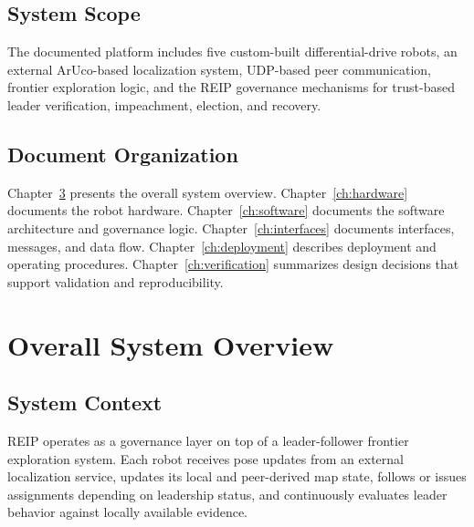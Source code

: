 \documentclass[a4paper,oneside,titlepage,11pt]{report}
\begin{document}
\section{System Scope}
The documented platform includes five custom-built differential-drive robots, an external ArUco-based localization system, UDP-based peer communication, frontier exploration logic, and the REIP governance mechanisms for trust-based leader verification, impeachment, election, and recovery.

\section{Document Organization}
Chapter~\ref{ch:overview} presents the overall system overview. Chapter~\ref{ch:hardware} documents the robot hardware. Chapter~\ref{ch:software} documents the software architecture and governance logic. Chapter~\ref{ch:interfaces} documents interfaces, messages, and data flow. Chapter~\ref{ch:deployment} describes deployment and operating procedures. Chapter~\ref{ch:verification} summarizes design decisions that support validation and reproducibility.

\chapter{Overall System Overview}
\label{ch:overview}

\section{System Context}
REIP operates as a governance layer on top of a leader-follower frontier exploration system. Each robot receives pose updates from an external localization service, updates its local and peer-derived map state, follows or issues assignments depending on leadership status, and continuously evaluates leader behavior against locally available evidence.
\end{document}
